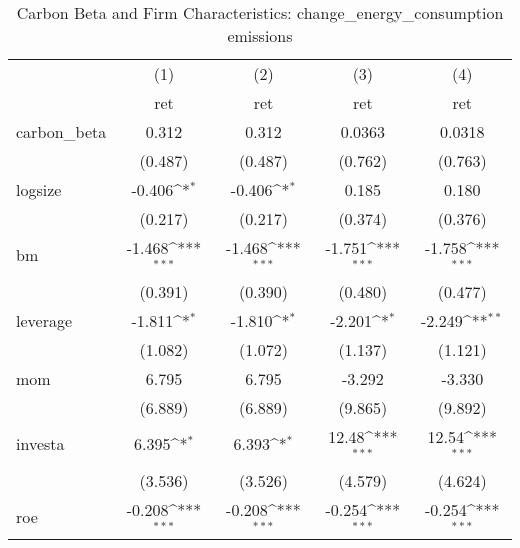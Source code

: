 \begin{table}[htbp]\centering
\def\sym#1{\ifmmode^{#1}\else\(^{#1}\)\fi}
\caption{Carbon Beta and Firm Characteristics: change\_energy\_consumption emissions}
\begin{tabular}{l*{4}{c}}
\hline\hline
                    &\multicolumn{1}{c}{(1)}&\multicolumn{1}{c}{(2)}&\multicolumn{1}{c}{(3)}&\multicolumn{1}{c}{(4)}\\
                    &\multicolumn{1}{c}{ret}&\multicolumn{1}{c}{ret}&\multicolumn{1}{c}{ret}&\multicolumn{1}{c}{ret}\\
\hline
carbon\_beta         &       0.312         &       0.312         &      0.0363         &      0.0318         \\
                    &     (0.487)         &     (0.487)         &     (0.762)         &     (0.763)         \\
[1em]
logsize             &      -0.406\sym{*}  &      -0.406\sym{*}  &       0.185         &       0.180         \\
                    &     (0.217)         &     (0.217)         &     (0.374)         &     (0.376)         \\
[1em]
bm                  &      -1.468\sym{***}&      -1.468\sym{***}&      -1.751\sym{***}&      -1.758\sym{***}\\
                    &     (0.391)         &     (0.390)         &     (0.480)         &     (0.477)         \\
[1em]
leverage            &      -1.811\sym{*}  &      -1.810\sym{*}  &      -2.201\sym{*}  &      -2.249\sym{**} \\
                    &     (1.082)         &     (1.072)         &     (1.137)         &     (1.121)         \\
[1em]
mom                 &       6.795         &       6.795         &      -3.292         &      -3.330         \\
                    &     (6.889)         &     (6.889)         &     (9.865)         &     (9.892)         \\
[1em]
investa             &       6.395\sym{*}  &       6.393\sym{*}  &       12.48\sym{***}&       12.54\sym{***}\\
                    &     (3.536)         &     (3.526)         &     (4.579)         &     (4.624)         \\
[1em]
roe                 &      -0.208\sym{***}&      -0.208\sym{***}&      -0.254\sym{***}&      -0.254\sym{***}\\

\end{tabular}
\end{table}
